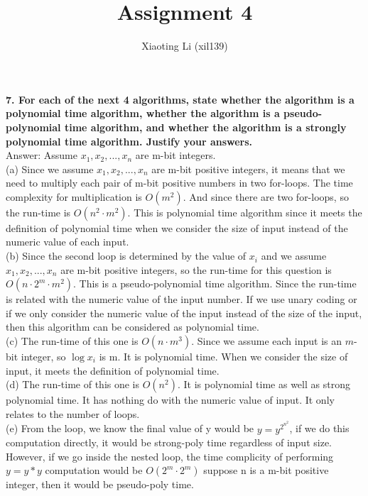 \documentclass{article}
\title{Assignment 4}
\author{Xiaoting Li (xil139)}
\date{}
\begin{document}
\maketitle

\noindent
\textbf{7. For each of the next 4 algorithms, state whether the algorithm is a polynomial time algorithm, whether the algorithm is a pseudo-polynomial time algorithm, and whether the algorithm is a strongly polynomial time algorithm. Justify your answers.} \\ \newline
Answer: Assume $x_1, x_2, ..., x_n$ are m-bit integers. \\
(a) Since we assume $x_1, x_2, ..., x_n$ are m-bit positive integers, it means that we need to multiply each pair of m-bit positive numbers in two for-loops. The time complexity for multiplication is $O(m^{2})$. And since there are two for-loops, so the run-time is $O(n^{2}\cdot m{^2})$. This is polynomial time algorithm since it meets the definition of polynomial time when we consider the size of input instead of the numeric value of each input.\\
(b) Since the second loop is determined by the value of $x_i$ and we assume $x_1, x_2, ..., x_n$ are m-bit positive integers, so the run-time for this question is $O(n\cdot 2^{m}\cdot m{^2})$. This is a pseudo-polynomial time algorithm. Since the run-time is related with the numeric value of the input number. If we use unary coding or if we only consider the numeric value of the input instead of the size of the input, then this algorithm can be considered as polynomial time. \\
(c) The run-time of this one is $O(n\cdot m^{3})$. Since we assume each input is an $m$-bit integer, so $\log{x_i}$ is m. It is polynomial time. When we consider the size of input, it meets the definition of polynomial time.\\
(d) The run-time of this one is $O(n^{2})$. It is polynomial time as well as strong polynomial time. It has nothing do with the numeric value of input. It only relates to the number of loops.\\
(e) From the loop, we know the final value of y would be $y = y^2^n^2$, if we do this computation directly, it would be strong-poly time regardless of input size. However, if we go inside the nested loop, the time complicity of performing $y = y*y$ computation would be $O(2^{m}\cdot2^{m})$ suppose n is a m-bit positive integer, then it would be pseudo-poly time.
\\  \newline
\end{document}
